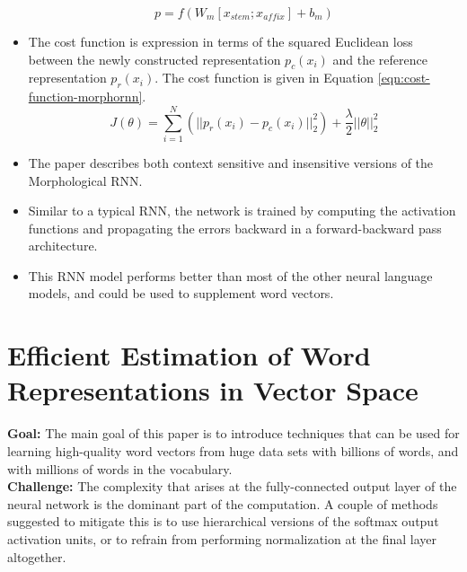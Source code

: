 \documentclass[11pt,a4paper]{article}
\begin{document}
\begin{itemize}
    \begin{equation} \label{eqn:parent-vector}
      p = f (W_m [x_{stem} ; x_{affix}] + b_m)
    \end{equation}
    \item
    The cost function is expression in terms of the squared Euclidean loss between the newly constructed representation $p_c(x_i)$ and the reference representation $p_r(x_i)$. The cost function is given in Equation \ref{eqn:cost-function-morphornn}.
    \begin{equation} \label{eqn:cost-function-morphornn}
      J(\theta) = \sum_{i=1}^N (|| p_r(x_i) - p_c(x_i) ||^2_2) + \frac{\lambda}{2} ||\theta||^2_2
    \end{equation}
    \item
    The paper describes both context sensitive and insensitive versions of the Morphological RNN.
    \item
    Similar to a typical RNN, the network is trained by computing the activation functions and propagating the errors backward in a forward-backward pass architecture.
    \item 
    This RNN model performs better than most of the other neural language models, and could be used to supplement word vectors.
  \end{itemize}



\section{Efficient Estimation of Word Representations in Vector Space} %
\label{sec:efficient_estimation_of_word_representations_in_vector_space}

  \textbf{Goal:}
  The main goal of this paper is to introduce techniques that can be used for learning high-quality word vectors from huge data sets with billions of words, and with millions of words in the vocabulary\cite{mikolov2013efficient}.\\

  \textbf{Challenge:}
  The complexity that arises at the fully-connected output layer of the neural network is the dominant part of the computation. A couple of methods suggested to mitigate this is to use hierarchical versions of the softmax output activation units, or to refrain from performing normalization at the final layer altogether.\\
\end{document}
